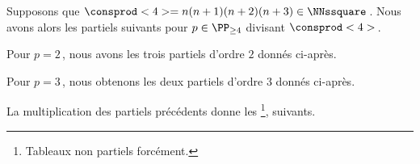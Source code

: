 Supposons que $\consprod<4> = n(n+1)(n+2)(n+3) \in \NNssquare$\,. Nous avons alors les \sftab[x] partiels suivants pour $p \in \PP_{\geq 4}$ divisant $\consprod<4>$\,.

\begin{center}
\end{center}


Pour $p = 2$\,, nous avons les trois \sftab[x] partiels d'ordre $2$ donnés ci-après.

\begin{center}
\end{center}


\newpage
Pour $p = 3$\,, nous obtenons les deux \sftab[x] partiels d'ordre $3$ donnés ci-après.

\begin{center}
\end{center}


La multiplication des \sftab[x] partiels précédents donne les \sftab[x]
\footnote{
	Tableaux non partiels forcément.
},
suivants.

